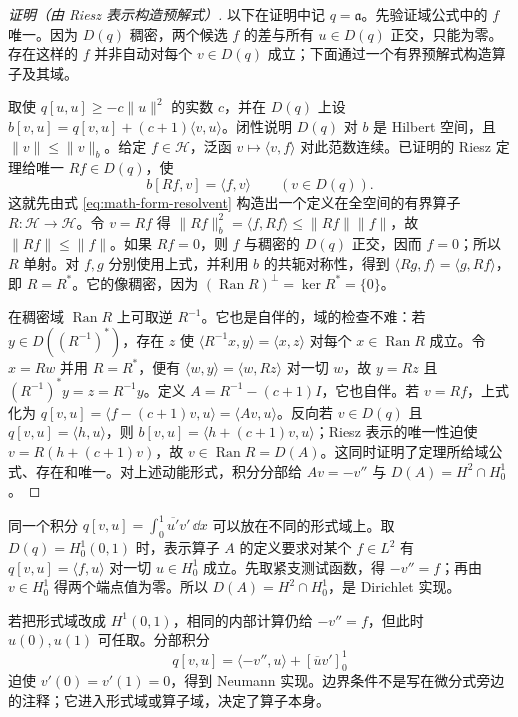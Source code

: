 \begin{proof}[证明（由 Riesz 表示构造预解式）]
以下在证明中记 $q=\mathfrak a$。先验证域公式中的 \(f\) 唯一。因为 \(D(q)\) 稠密，两个候选 \(f\) 的差与所有 \(u\in D(q)\) 正交，只能为零。
存在这样的 \(f\) 并非自动对每个 \(v\in D(q)\) 成立；下面通过一个有界预解式构造算子及其域。

取使 \(q[u,u]\ge-c\|u\|^2\) 的实数 \(c\)，并在 \(D(q)\) 上设 \(b[v,u]=q[v,u]+(c+1)\langle v,u\rangle\)。闭性说明 \(D(q)\) 对 \(b\) 是 Hilbert 空间，且 \(\|v\|\le\|v\|_b\)。给定 \(f\in\mathcal H\)，泛函 \(v\mapsto\langle v,f\rangle\) 对此范数连续。已证明的 Riesz 定理给唯一 \(Rf\in D(q)\)，使
\begin{equation}
 b[Rf,v]=\langle f,v\rangle\qquad(v\in D(q)).
 \label{eq:math-form-resolvent}
\end{equation}
这就先由式 \cref{eq:math-form-resolvent} 构造出一个定义在全空间的有界算子 \(R:\mathcal H\to\mathcal H\)。令 \(v=Rf\) 得 \(\|Rf\|_b^2=\langle f,Rf\rangle\le\|Rf\|\|f\|\)，故 \(\|Rf\|\le\|f\|\)。如果 \(Rf=0\)，则 \(f\) 与稠密的 \(D(q)\) 正交，因而 \(f=0\)；所以 \(R\) 单射。对 \(f,g\) 分别使用上式，并利用 \(b\) 的共轭对称性，得到 \(\langle Rg,f\rangle=\langle g,Rf\rangle\)，即 \(R=R^*\)。它的像稠密，因为 \((\operatorname{Ran}R)^\perp=\ker R^*=\{0\}\)。

在稠密域 \(\operatorname{Ran}R\) 上可取逆 \(R^{-1}\)。它也是自伴的，域的检查不难：若 \(y\in D((R^{-1})^*)\)，存在 \(z\) 使 \(\langle R^{-1}x,y\rangle=\langle x,z\rangle\) 对每个 \(x\in\operatorname{Ran}R\) 成立。令 \(x=Rw\) 并用 \(R=R^*\)，便有 \(\langle w,y\rangle=\langle w,Rz\rangle\) 对一切 \(w\)，故 \(y=Rz\) 且 \((R^{-1})^*y=z=R^{-1}y\)。定义 \(A=R^{-1}-(c+1)I\)，它也自伴。若 \(v=Rf\)，上式化为 \(q[v,u]=\langle f-(c+1)v,u\rangle=\langle Av,u\rangle\)。反向若 \(v\in D(q)\) 且 \(q[v,u]=\langle h,u\rangle\)，则 \(b[v,u]=\langle h+(c+1)v,u\rangle\)；Riesz 表示的唯一性迫使 \(v=R(h+(c+1)v)\)，故 \(v\in\operatorname{Ran}R=D(A)\)。这同时证明了定理所给域公式、存在和唯一。对上述动能形式，积分分部给 \(Av=-v''\) 与 \(D(A)=H^2\cap H_0^1\)。

\end{proof}


\begin{example}[同一能量密度与不同边界实现]

同一个积分 \(q[v,u]=\int_0^1\overline{u'}v'\,\dd x\) 可以放在不同的形式域上。取 \(D(q)=H_0^1(0,1)\) 时，表示算子 \(A\) 的定义要求对某个 \(f\in L^2\) 有 \(q[v,u]=\langle f,u\rangle\) 对一切 \(u\in H_0^1\) 成立。先取紧支测试函数，得 \(-v''=f\)；再由 \(v\in H_0^1\) 得两个端点值为零。所以 \(D(A)=H^2\cap H_0^1\)，是 Dirichlet 实现。

若把形式域改成 \(H^1(0,1)\)，相同的内部计算仍给 \(-v''=f\)，但此时 \(u(0),u(1)\) 可任取。分部积分
\[
q[v,u]=\langle -v'',u\rangle+[\overline u v']_0^1
\]
迫使 \(v'(0)=v'(1)=0\)，得到 Neumann 实现。边界条件不是写在微分式旁边的注释；它进入形式域或算子域，决定了算子本身。\end{example}

